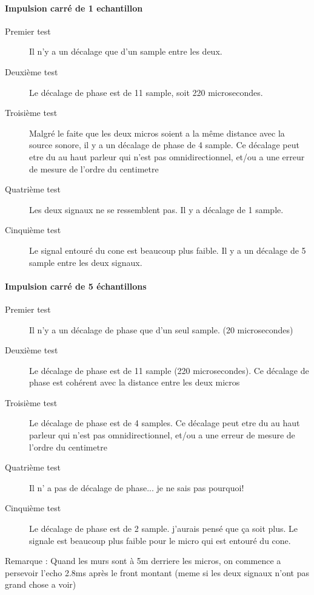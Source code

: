 \documentclass[12pt,a4paper]{report}
\begin{document}
\paragraph{Impulsion carré de 1 echantillon}
\begin{description}
\item[Premier test] Il n'y a un décalage que d'un sample entre les deux.
\item[Deuxième test] Le décalage de phase est de 11 sample, soit 220 microsecondes.
\item[Troisième test] Malgré le faite que les deux micros soient a la même distance avec la source sonore, il y a un décalage de phase de 4 sample. Ce décalage peut etre du au haut parleur qui n'est pas omnidirectionnel, et/ou a une erreur de mesure de l'ordre du centimetre
\item[Quatrième test] Les deux signaux ne se ressemblent pas. Il y a décalage de 1 sample.
\item[Cinquième test] Le signal entouré du cone est beaucoup plus faible. Il y a un décalage de 5 sample entre les deux signaux.
\end{description}

\paragraph{Impulsion carré de 5 échantillons}
\begin{description}
\item[Premier test] Il n'y a un décalage de phase que d'un seul sample. (20 microsecondes)
\item[Deuxième test] Le décalage de phase est de 11 sample (220 microsecondes). Ce décalage de phase est cohérent avec la distance entre les deux micros
\item[Troisième test] Le décalage de phase est de 4 samples.  Ce décalage peut etre du au haut parleur qui n'est pas omnidirectionnel, et/ou a une erreur de mesure de l'ordre du centimetre
\item[Quatrième test] Il n' a pas de décalage de phase... je ne sais pas pourquoi!
\item[Cinquième test] Le décalage de phase est de 2 sample. j'aurais pensé que ça soit plus. Le signale est beaucoup plus faible pour le micro qui est entouré du cone. 
\end{description}
\begin{huge}
Remarque : Quand les murs sont à 5m derriere les micros, on commence a persevoir l'echo 2.8ms après le front montant (meme si les deux signaux n'ont pas grand chose a voir)
\end{huge}
\end{document}
